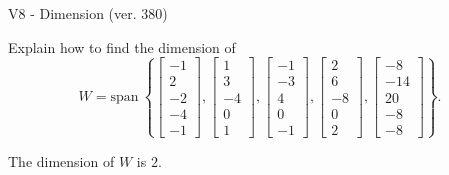 \begin{exercise}
  \begin{exerciseTitle}V8 - Dimension (ver. 380)\end{exerciseTitle}
  \begin{exerciseStatement}
    Explain how to find the dimension of 
\[W=\mathrm{span}\ \left\{\left[\begin{array}{r}
-1 \\
2 \\
-2 \\
-4 \\
-1
\end{array}\right] , \left[\begin{array}{r}
1 \\
3 \\
-4 \\
0 \\
1
\end{array}\right] , \left[\begin{array}{r}
-1 \\
-3 \\
4 \\
0 \\
-1
\end{array}\right] , \left[\begin{array}{r}
2 \\
6 \\
-8 \\
0 \\
2
\end{array}\right] , \left[\begin{array}{r}
-8 \\
-14 \\
20 \\
-8 \\
-8
\end{array}\right]\right\}.\]



  \end{exerciseStatement}
  \begin{exerciseAnswer}
   The dimension of \(W\) is  \(2\).
  


  \end{exerciseAnswer}
\end{exercise}